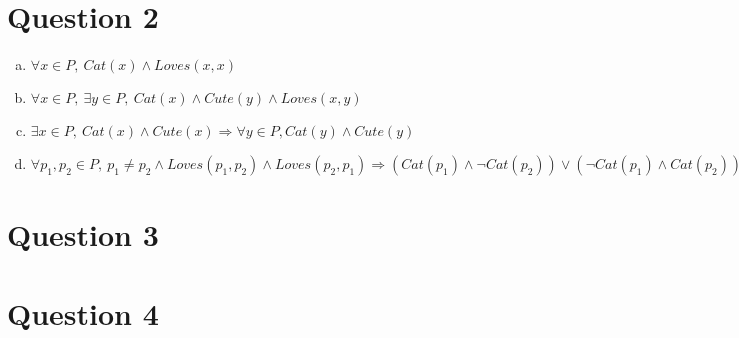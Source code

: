 \documentclass[12pt]{article}
\begin{document}
\section*{Question 2}
\begin{enumerate}[a.]
    \item

    $\forall x \in P,\:Cat(x) \land Loves(x,x)$

    \item

    $\forall x \in P,\: \exists y \in P,\: Cat(x) \land Cute(y) \land Loves(x,y)$

    \item

    $\exists x \in P,\: Cat(x) \land Cute(x) \Rightarrow \forall y \in P, Cat(y)
    \land Cute(y)$

    \item

    $\forall p_1,p_2 \in P,\:p_1 \neq p_2 \land Loves(p_1,p_2) \land Loves(p_2,p_1)
    \Rightarrow (Cat(p_1) \land \neg Cat(p_2)) \lor (\neg Cat(p_1) \land Cat(p_2))$

\end{enumerate}

\section*{Question 3}

\section*{Question 4}
\end{document}
